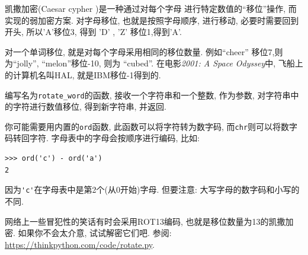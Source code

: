 \documentclass[10pt]{book}
\begin{document}
\begin{exercise}

\label{exrotate}
凯撒加密(Caesar cypher )是一种通过对每个字母
进行特定数值的``移位''操作, 而实现的弱加密方案. 
对字母移位, 也就是按照字母顺序, 进行移动, 必要时需要回到开头,  
所以'A'移位3, 得到 'D' ,   'Z' 移位1,得到'A'. 

对一个单词移位, 就是对每个字母采用相同的移位数量. 
例如``cheer'' 移位7,则为``jolly'',  ``melon''移位-10, 则为 ``cubed''. 
在电影{\em 2001: A Space Odyssey}中, 飞船上的计算机名叫HAL, 
就是IBM移位-1得到的. 


编写名为\verb"rotate_word"的函数, 接收一个字符串和一个整数, 作为参数, 
对字符串中的字符进行数值移位, 得到新字符串, 并返回. 

你可能需要用内置的{\tt ord}函数, 此函数可以将字符转为数字码, 
而{\tt chr}则可以将数字码转回字符. 
字母表中的字母会按顺序进行编码, 比如:

\begin{verbatim}
>>> ord('c') - ord('a')
2
\end{verbatim}
因为\verb"'c'"在字母表中是第2个(从0开始)字母. 
但要注意: 大写字母的数字码和小写的不同. 

网络上一些冒犯性的笑话有时会采用ROT13编码, 也就是移位数量为13的凯撒加密. 
如果你不会太介意, 试试解密它们吧. 参阅:
\url{https://thinkpython.com/code/rotate.py}.

\end{exercise}
\end{document}

